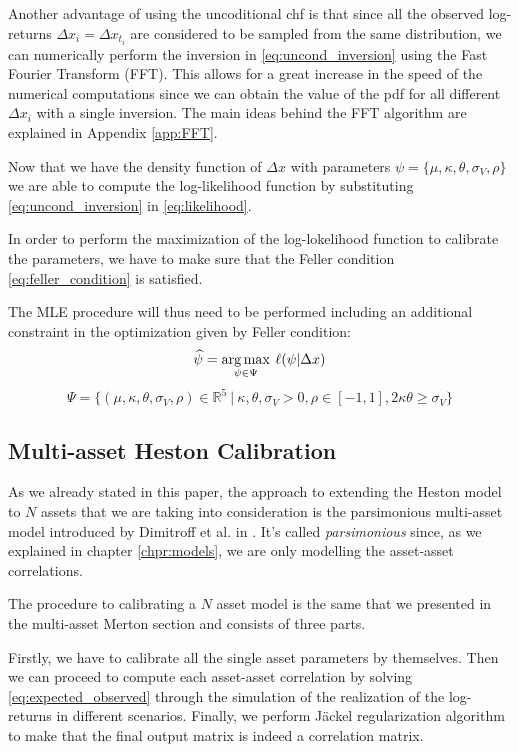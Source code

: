 Another advantage of using the uncoditional chf is that since all the observed log-returns $\Delta x_i = \Delta x_{t_i} $ are considered to be sampled from the same distribution, we can numerically perform the inversion in \eqref{eq:uncond_inversion} using the Fast Fourier Transform (FFT). This allows for a great increase in the speed of the numerical computations since we can obtain the value of the pdf for all different $\Delta x_i$ with a single inversion.
The main ideas behind the FFT algorithm are explained in Appendix \ref{app:FFT}.


Now that we have the density function of $\Delta x$ with parameters $\psi = \{\mu, \kappa, \theta, \sigma_V, \rho \}$ we are able to compute the log-likelihood function by substituting \eqref{eq:uncond_inversion} in \eqref{eq:likelihood}.


In order to perform the maximization of the log-lokelihood function to calibrate the parameters, we have to make sure that the Feller condition \eqref{eq:feller_condition} is satisfied.

The MLE procedure will thus need to be performed including an additional constraint in the optimization given by Feller condition:
\begin{equation}
\widehat{\psi} = \operatorname*{arg\,max}_{\psi \in \Psi} \:\ell(\psi |  \Delta x)
\end{equation}
\begin{equation}
	\Psi = \{ (\mu, \kappa, \theta, \sigma_V, \rho) \in \mathbb{R}^5 \: |\: \kappa,\theta,\sigma_V >0, \rho \in [-1,1], 2\kappa\theta \geq \sigma_V \}
\end{equation}

\subsection{Multi-asset Heston Calibration}
\label{sec:multi_heston_cal}
As we already stated in this paper, the approach to extending the Heston model to $N$ assets that we are taking into consideration is the parsimonious multi-asset model introduced by Dimitroff et al. in \cite{PARSIMONIOUS2011}.
It's called \textit{parsimonious} since, as we explained in chapter \ref{chpr:models}, we are only modelling the asset-asset correlations.

The procedure to calibrating a $N$ asset model is the same that we presented in the multi-asset Merton section and consists of three parts.

Firstly, we have to calibrate all the single asset parameters by themselves. Then we can proceed to compute each asset-asset correlation by solving \eqref{eq:expected_observed} through the simulation of the realization of the log-returns in different scenarios.
Finally, we perform J\"ackel regularization algorithm to make that the final output matrix is indeed a correlation matrix.

